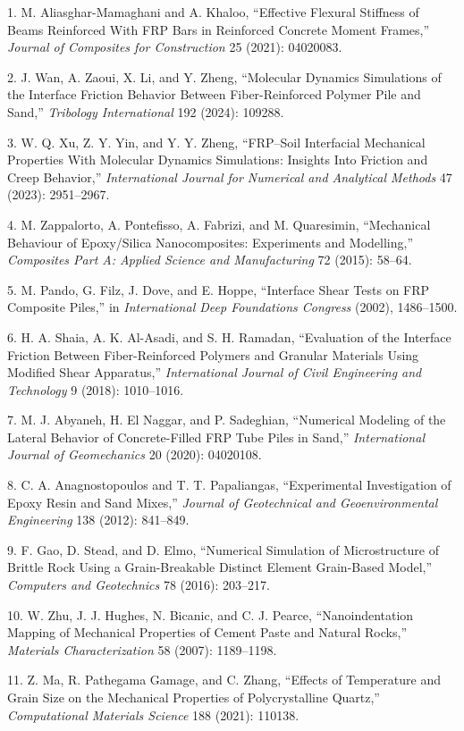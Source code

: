 \documentclass{article}
\begin{document}
\begin{hangpars}
1. M. Aliasghar-Mamaghani and A. Khaloo, “Effective Flexural Stiffness of Beams Reinforced With FRP Bars in Reinforced Concrete Moment Frames,” \emph{Journal of Composites for Construction} 25 (2021): 04020083.

2. J. Wan, A. Zaoui, X. Li, and Y. Zheng, “Molecular Dynamics Simulations of the Interface Friction Behavior Between Fiber-Reinforced Polymer Pile and Sand,” \emph{Tribology International} 192 (2024): 109288.

3. W. Q. Xu, Z. Y. Yin, and Y. Y. Zheng, “FRP–Soil Interfacial Mechanical Properties With Molecular Dynamics Simulations: Insights Into Friction and Creep Behavior,” \emph{International Journal for Numerical and Analytical Methods} 47 (2023): 2951–2967.

4. M. Zappalorto, A. Pontefisso, A. Fabrizi, and M. Quaresimin, “Mechanical Behaviour of Epoxy/Silica Nanocomposites: Experiments and Modelling,” \emph{Composites Part A: Applied Science and Manufacturing} 72 (2015): 58–64.

5. M. Pando, G. Filz, J. Dove, and E. Hoppe, “Interface Shear Tests on FRP Composite Piles,” in \emph{International Deep Foundations Congress} (2002), 1486–1500.

6. H. A. Shaia, A. K. Al-Asadi, and S. H. Ramadan, “Evaluation of the Interface Friction Between Fiber-Reinforced Polymers and Granular Materials Using Modified Shear Apparatus,” \emph{International Journal of Civil Engineering and Technology} 9 (2018): 1010–1016.

7. M. J. Abyaneh, H. El Naggar, and P. Sadeghian, “Numerical Modeling of the Lateral Behavior of Concrete-Filled FRP Tube Piles in Sand,” \emph{International Journal of Geomechanics} 20 (2020): 04020108.

8. C. A. Anagnostopoulos and T. T. Papaliangas, “Experimental Investigation of Epoxy Resin and Sand Mixes,” \emph{Journal of Geotechnical and Geoenvironmental Engineering} 138 (2012): 841–849.

9. F. Gao, D. Stead, and D. Elmo, “Numerical Simulation of Microstructure of Brittle Rock Using a Grain-Breakable Distinct Element Grain-Based Model,” \emph{Computers and Geotechnics} 78 (2016): 203–217.

10. W. Zhu, J. J. Hughes, N. Bicanic, and C. J. Pearce, “Nanoindentation Mapping of Mechanical Properties of Cement Paste and Natural Rocks,” \emph{Materials Characterization} 58 (2007): 1189–1198.

11. Z. Ma, R. Pathegama Gamage, and C. Zhang, “Effects of Temperature and Grain Size on the Mechanical Properties of Polycrystalline Quartz,” \emph{Computational Materials Science} 188 (2021): 110138.


\end{hangpars}
\end{document}
